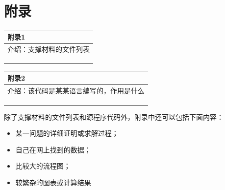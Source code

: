 \documentclass{my_paper}
\begin{document}
\section{附录}

\begin{table}[htbp]
    \centering
    \begin{tabular}{|p{14.0cm}|}
    \hline
    \textbf{附录1} \\ %
    \hline
    介绍：支撑材料的文件列表  \\ 
    \\
    \\
    \\
    \hline
    \end{tabular}
\end{table}

\begin{table}[htbp]
    \centering
    \begin{tabular}{|p{14.0cm}|}
    \hline
    \textbf{附录2} \\ %
    \hline
    介绍：该代码是某某语言编写的，作用是什么   \\ 
    \\
    \\
    \\
    \hline
    \end{tabular}
\end{table}

除了支撑材料的文件列表和源程序代码外，附录中还可以包括下面内容：
\begin{itemize}
\item 某一问题的详细证明或求解过程；
\item 自己在网上找到的数据；
\item 比较大的流程图；
\item 较繁杂的图表或计算结果
\end{itemize}
\end{document}
